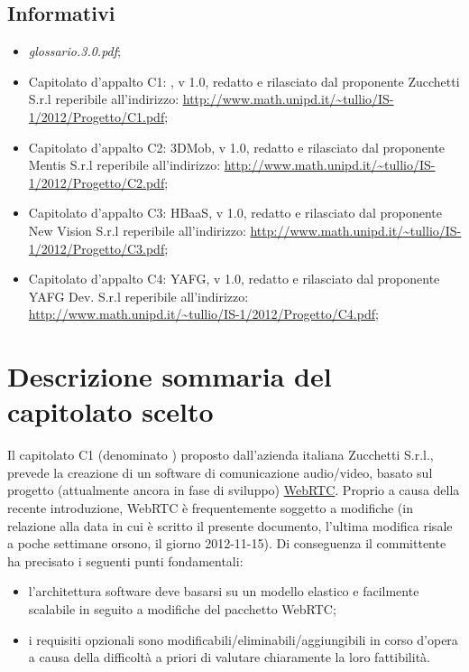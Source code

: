 \subsection{Informativi}
\begin{itemize}
\item[] \textit{glossario.3.0.pdf};
\item[] Capitolato d'appalto C1: \caName{}, v 1.0, redatto e rilasciato dal proponente Zucchetti S.r.l reperibile all'indirizzo: \url{http://www.math.unipd.it/~tullio/IS-1/2012/Progetto/C1.pdf};
\item[] Capitolato d'appalto C2: 3DMob, v 1.0, redatto e rilasciato dal proponente Mentis S.r.l reperibile all'indirizzo: \url{http://www.math.unipd.it/~tullio/IS-1/2012/Progetto/C2.pdf};
\item[] Capitolato d'appalto C3: HBaaS, v 1.0, redatto e rilasciato dal proponente New Vision S.r.l reperibile all'indirizzo: \url{http://www.math.unipd.it/~tullio/IS-1/2012/Progetto/C3.pdf};
\item[] Capitolato d'appalto C4: YAFG, v 1.0, redatto e rilasciato dal proponente YAFG Dev. S.r.l reperibile all'indirizzo: \url{http://www.math.unipd.it/~tullio/IS-1/2012/Progetto/C4.pdf};
\end{itemize}
\clearpage
\section{Descrizione sommaria del capitolato scelto}
Il capitolato C1 (denominato \caName{}) proposto dall'azienda italiana Zucchetti S.r.l., prevede la creazione di un software di comunicazione audio/video, basato sul progetto (attualmente ancora in fase di sviluppo) \underline{WebRTC}. Proprio a causa della recente introduzione, WebRTC è frequentemente soggetto a modifiche (in relazione alla data in cui è scritto il presente documento, l'ultima modifica risale a poche settimane orsono, il giorno 2012-11-15). Di conseguenza il committente ha precisato i seguenti punti fondamentali:

\begin{itemize}
	\item l'architettura software deve basarsi su un modello elastico e facilmente scalabile in seguito a modifiche del pacchetto WebRTC;
	\item i requisiti opzionali sono modificabili/eliminabili/aggiungibili in corso d'opera a causa della difficoltà a priori di valutare chiaramente la loro fattibilità.
\end{itemize}


